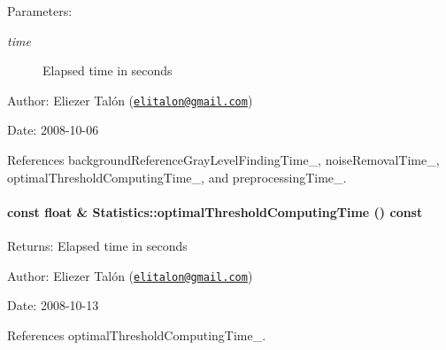 \begin{Desc}
\item[Parameters:]
\begin{description}
\item[{\em time}]Elapsed time in seconds\end{description}
\end{Desc}
\begin{Desc}
\item[Author:]Eliezer Talón (\href{mailto:elitalon@gmail.com}{\tt elitalon@gmail.com}) \end{Desc}
\begin{Desc}
\item[Date:]2008-10-06 \end{Desc}


References backgroundReferenceGrayLevelFindingTime\_\-, noiseRemovalTime\_\-, optimalThresholdComputingTime\_\-, and preprocessingTime\_\-.\hypertarget{class_statistics_3a364709b9fe8dbefd03b3bb45d9a89d}{
\paragraph[{optimalThresholdComputingTime}]{\setlength{\rightskip}{0pt plus 5cm}const float \& Statistics::optimalThresholdComputingTime () const}\hfill}
\label{class_statistics_3a364709b9fe8dbefd03b3bb45d9a89d}


\begin{Desc}
\item[Returns:]Elapsed time in seconds\end{Desc}
\begin{Desc}
\item[Author:]Eliezer Talón (\href{mailto:elitalon@gmail.com}{\tt elitalon@gmail.com}) \end{Desc}
\begin{Desc}
\item[Date:]2008-10-13 \end{Desc}


References optimalThresholdComputingTime\_\-.

